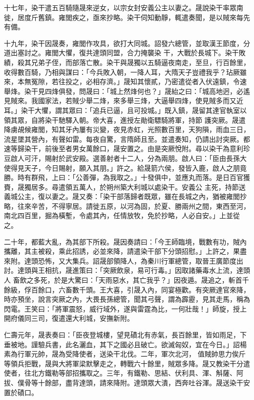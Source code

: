 \begin{pinyinscope}
 十七年，染干遣五百騎隨晟來逆女，以宗女封安義公主以妻之。晟說染干率眾南徙，居度斤舊鎮。雍閭疾之，亟來抄略。染干伺知動靜，輒遣奏聞，是以賊來每先有備。



 十九年，染干因晟奏，雍閭作攻具，欲打大同城。詔發六總管，並取漢王節度，分道出塞討之。雍閭大懼，復共達頭同盟，合力掩襲染
 干，大戰於長城下。染干敗績，殺其兄弟子侄，而部落亡散。染干與晟獨以五騎逼夜南走，至旦，行百餘里，收得數百騎，乃相與謀曰：「今兵敗入朝，一降人耳，大隋天子豈禮我乎？玷厥雖來，本無冤隙，若往投之，必相存濟。」晟知其懷貳，乃密遣從者入伏遠鎮，令速舉烽。染干見四烽俱發，問晟曰：「城上然烽何也？」晟紿之曰：「城高地迥，必遙見賊來。我國家法，若賊少舉二烽，來多舉三烽，大逼舉四烽，使見賊多而又近耳。」染干大懼，謂其眾曰：「追兵已逼，且可投城。」既入鎮，晟留其達官執室以領其眾，自將染干馳驛入朝。帝大喜，進授左勛衛驃騎將軍，持節
 護突厥。晟遣降虜覘候雍閭，知其牙內屢有災變，夜見赤虹，光照數百里，天狗隕，雨血三日，流星墜其營內，有聲如雷。每夜自驚，言隋師且至。並遣奏知，仍請出討突厥。都速等歸染干，前後至者男女萬餘口，晟安置之。由是突厥悅附。尋以染干為意利珍豆啟人可汗，賜射於武安殿。選善射者十二人，分為兩朋。啟人曰：「臣由長孫大使得見天子，今日賜射，願入其朋。」許之。給晟箭六侯，發皆入鹿，啟人之朋竟勝。時有群飛，上曰：「公善彈，為我取之。」十發俱中，並應丸而落。是日百官獲賚，晟獨居多。尋遣領五萬人，於朔州築大利城以處染干。安義公
 主死，持節送義城公主，復以妻之。晟又奏：「染干部落歸者既眾，雖在長城之內，猶被雍閭抄略，往來辛苦，不得寧居。請徙五原，以河為固，於夏、勝兩州之間，東西至河，南北四百里，掘為橫塹，令處其內，任情放牧，免於抄略，人必自安。」上並從之。



 二十年，都藍大亂，為其部下所殺。晟因奏請曰：「今王師臨境，戰數有功，賊內攜離，其主被殺，乘此招誘，必並來降，請遣染干部下分頭招慰。」上許之，果盡來附。達頭恐怖，又大集兵。詔晟部領降人，為秦川行軍總管，取晉王廣節度出討。達頭與王相抗，晟進策曰：「突厥飲泉，易可行毒。」因取諸藥毒水上流，達頭人
 畜飲之多死，於是大驚曰：「天雨惡水，其亡我乎？」因夜遁。晟追之，斬首千餘級，俘百餘口，六畜數千頭。王大喜，引晟入內，同宴極歡。有突厥達官來降，時亦預坐，說言突厥之內，大畏長孫總管，聞其弓聲，謂為霹靂，見其走馬，稱為閃電。王笑曰：「將軍震怒，威行域外，遂與雷霆為比，一何壯哉！」師旋，授上開府儀同三司，復遣還大利城，安撫新附。



 仁壽元年，晟表奏曰：「臣夜登城樓，望見磧北有赤氣，長百餘里，皆如雨足，下垂被地。謹驗兵書，此名灑血，其下之國必且破亡。欲滅匈奴，宜在今日。」詔楊素為行軍元帥，晟為受降使者，送染干北伐。二年，軍次北河，
 值賊帥思力俟斤等領兵拒戰，晟與大將軍梁默擊走之，轉戰六十餘里，賊眾多降。晟又教染干分遣使者，往北方鐵勒等部招攜取之。三年，有鐵勒、思結、伏利具、渾、斛薩、阿拔、僕骨等十餘部，盡背達頭，請來降附。達頭眾大潰，西奔吐谷渾。晟送染干安置於磧口。




\end{pinyinscope}
